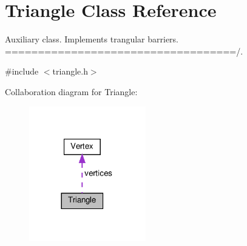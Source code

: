 \hypertarget{class_triangle}{}\section{Triangle Class Reference}
\label{class_triangle}


Auxiliary class. Implements trangular barriers. ===================================/.  




{\ttfamily \#include $<$triangle.\+h$>$}



Collaboration diagram for Triangle\+:
\nopagebreak
\begin{figure}[H]
\begin{center}
\leavevmode
\includegraphics[width=144pt]{class_triangle__coll__graph}
\end{center}
\end{figure}

